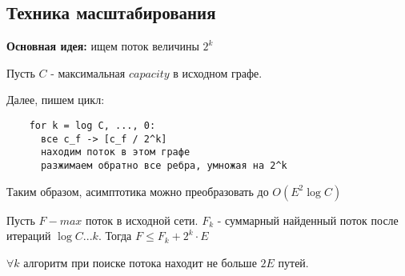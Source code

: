 \subsection{Техника масштабирования}

\textbf{Основная идея:} ищем поток величины $2^k$

Пусть $C$ - максимальная $capacity$ в исходном графе.

Далее, пишем цикл:
\begin{center}
  \begin{verbatim}
    for k = log C, ..., 0:
      все c_f -> [c_f / 2^k]
      находим поток в этом графе
      разжимаем обратно все ребра, умножая на 2^k
  \end{verbatim}
\end{center}

Таким образом, асимптотика можно преобразовать до $O(E^2 \log{C})$

\begin{lemma}
  Пусть $F - max$ поток в исходной сети. $F_k$ - суммарный найденный поток после итераций $\log{C} ... k$. Тогда $F \le F_k + 2^k \cdot E$
\end{lemma}
\begin{lemma}
  $\forall k$ алгоритм при поиске потока находит не больше $2E$ путей.
\end{lemma}
